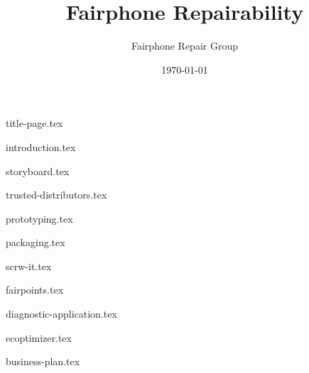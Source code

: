 \documentclass[final,a4paper]{report} %
\author{Fairphone Repair Group}
\title{Fairphone Repairability}
\date{\today}
\begin{document}
{title-page.tex}
\newpage
\tableofcontents

\newpage
{}
{introduction.tex}

{storyboard.tex}

{trusted-distributors.tex}

{prototyping.tex}

{packaging.tex}

{scrw-it.tex}

{fairpoints.tex}

{diagnostic-application.tex}

{ecoptimizer.tex}

{business-plan.tex}

\clearpage

\printbibliography[heading=bibintoc]

\end{document}
